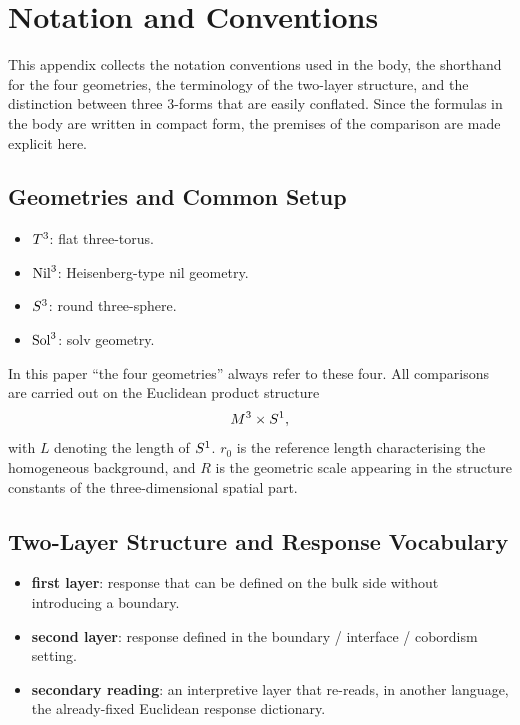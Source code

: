 \section{Notation and Conventions}
\label{app:A}

This appendix collects the notation conventions used in the body, the
shorthand for the four geometries, the terminology of the two-layer
structure, and the distinction between three 3-forms that are easily
conflated.  Since the formulas in the body are written in compact form, the
premises of the comparison are made explicit here.

\subsection{Geometries and Common Setup}
\label{app:A:geom}

\begin{itemize}
  \item $T^3$: flat three-torus.
  \item $\mathrm{Nil}^3$: Heisenberg-type nil geometry.
  \item $S^3$: round three-sphere.
  \item $\mathrm{Sol}^3$: solv geometry.
\end{itemize}

In this paper ``the four geometries'' always refer to these four.  All
comparisons are carried out on the Euclidean product structure
\begin{equation}
  M^3 \times S^1,
\end{equation}
with $L$ denoting the length of $S^1$.  $r_0$ is the reference length
characterising the homogeneous background, and $R$ is the geometric scale
appearing in the structure constants of the three-dimensional spatial part.

\subsection{Two-Layer Structure and Response Vocabulary}
\label{app:A:layer}

\begin{itemize}
  \item \textbf{first layer}: response that can be defined on the bulk side
        without introducing a boundary.
  \item \textbf{second layer}: response defined in the
        boundary / interface / cobordism setting.
  \item \textbf{secondary reading}: an interpretive layer that re-reads, in
        another language, the already-fixed Euclidean response dictionary.
\end{itemize}

